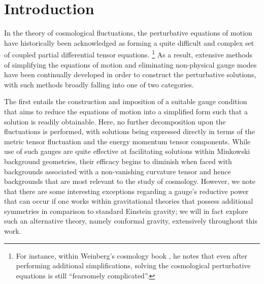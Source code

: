 
\chapter{Introduction}
\label{c:introduction}

In the theory of cosmological fluctuations, the perturbative equations of motion have historically been acknowledged as forming a quite difficult and complex set of coupled partial differential tensor equations. 
\renewcommand{\baselinestretch}{1}
\footnote{For instance, within Weinberg's cosmology book \cite{weinberg_2008}, he notes that even after performing additional simplifications, solving the cosmological perturbative equations is still ``fearsomely complicated''.}
As a result, extensive methods of simplifying the equations of motion and eliminating non-physical gauge modes have been continually developed in order to construct the perturbative solutions, with such methods broadly falling into one of two categories. 

The first entails the construction and imposition of a suitable gauge condition that aims to reduce the equations of motion into a simplified form such that a solution is readily obtainable. Here, no further decomposition upon the fluctuations is performed, with solutions being expressed directly in terms of the metric tensor fluctuation and the energy momentum tensor components. While use of such gauges are quite effective at facilitating solutions within Minkowski background geometries, their efficacy begins to diminish when faced with backgrounds associated with a non-vanishing curvature tensor and hence backgrounds that are most relevant to the study of cosmology. However, we note that there are some interesting exceptions regarding a gauge's reductive power that can occur if one works within gravitational theories that possess additional symmetries in comparison to standard Einstein gravity; we will in fact explore such an alternative theory, namely conformal gravity, extensively throughout this work. 

